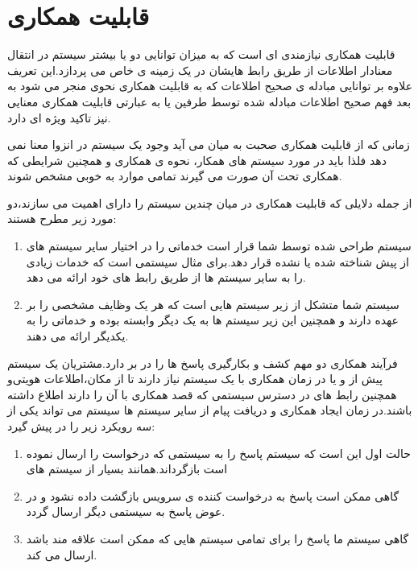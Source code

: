 \chapter{قابلیت همکاری}
قابلیت همکاری  نیازمندی ای است که به میزان توانایی دو یا بیشتر سیستم در انتقال معنادار اطلاعات از طریق رابط  هایشان در یک زمینه ی خاص می پردازد.این تعریف علاوه بر توانایی مبادله ی صحیح اطلاعات که به قابلیت همکاری نحوی  منجر می شود به بعد فهم صحیح اطلاعات مبادله شده توسط طرفین یا به عبارتی قابلیت همکاری معنایی  نیز تاکید ویژه ای دارد.

زمانی که از قابلیت همکاری صحبت به میان می آید وجود یک سیستم در انزوا معنا نمی دهد فلذا باید در مورد سیستم های همکار، نحوه ی همکاری و همچنین شرایطی که همکاری تحت آن صورت می گیرند تمامی موارد به خوبی مشخص شوند.

از جمله دلایلی که قابلیت همکاری در میان چندین سیستم را دارای اهمیت می سازند،‌دو مورد زیر مطرح هستند:
\begin{enumerate}
\item
سیستم طراحی شده توسط شما قرار است خدماتی را در اختیار سایر سیستم های از پیش شناخته شده یا نشده قرار دهد.برای مثال  سیستمی است که خدمات زیادی را به سایر سیستم ها از طریق رابط های خود ارائه می دهد.
\item
سیستم شما متشکل از زیر سیستم هایی است که هر یک وظایف مشخصی را بر عهده دارند و همچنین این زیر سیستم ها به یک دیگر وابسته بوده و خدماتی را به یکدیگر ارائه می دهند.
\end{enumerate}

فرآیند همکاری دو مهم کشف و بکارگیری پاسخ ها  را در بر دارد.مشتریان یک سیستم پیش از و یا در زمان همکاری با یک سیستم نیاز دارند تا از مکان‌،اطلاعات هویتی‌و همچنین رابط های در دسترس سیستمی که قصد همکاری با آن را دارند اطلاع داشته باشند.در زمان ایجاد همکاری و دریافت پیام از سایر سیستم ها سیستم می تواند یکی از سه رویکرد زیر را در پیش گیرد:
\begin{enumerate}
\item
حالت اول این است که سیستم پاسخ را به سیستمی که درخواست را ارسال نموده است بازگرداند.همانند بسیار از سیستم های 
\item
گاهی ممکن است پاسخ به درخواست کننده ی سرویس بازگشت داده نشود و در عوض پاسخ به سیستمی دیگر ارسال گردد.
\item
گاهی سیستم ما پاسخ را برای تمامی سیستم هایی که ممکن است علاقه مند باشد ارسال می کند.
\end{enumerate}

